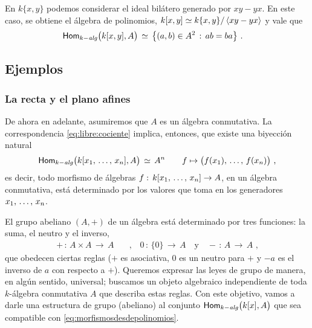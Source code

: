 \begin{ejemploLibre}\label{ejemplo:libre:cociente}
	En $k\{x,y\}$ podemos considerar el ideal bil\'{a}tero generado por
	$xy-yx$. En este caso, se obtiene el \'{a}lgebra de polinomios,
	$k[x,y]\simeq k\{x,y\}/\left\langle{xy-yx}\right\rangle_{}$ y vale que
	\begin{align*}
		\mathsf{Hom}_{k-\mathit{alg}}\big(k[x,y],A\big) & \,\simeq\,
			\big\{(a,b)\in A^2\,:\,ab=ba\big\}
		\text{ .}
	\end{align*}
\end{ejemploLibre}

\subsection{Ejemplos}\label{subsec:kalgebras:ejemplos}

\subsubsection{La recta y el plano afines}

De ahora en adelante, asumiremos que $A$ es un \'{a}lgebra conmutativa. La
correspondencia \eqref{eq:libre:cociente} implica, entonces, que existe una
biyecci\'{o}n natural
\begin{equation}
	\label{eq:morfismosdesdepolinomios}
	\Homalg\big(k[\lista{x}{n}],A\big) \,\simeq\, A^n
		\qquad f\mapsto\big(f(x_1),\,\dots,\,f(x_n)\big)
	\text{ ,}
\end{equation}
%
es decir, todo morfismo de \'{a}lgebras $f:\,k[\lista{x}{n}]\rightarrow A$, en
un \'{a}lgebra conmutativa, est\'{a} determinado por los valores que toma en
los generadores $\lista{x}{n}$.

El grupo abeliano $(A,+)$ de un \'{a}lgebra est\'{a} determinado por tres
funciones: la suma, el neutro y el inverso,
\begin{align*}
	+\,:\,A\times A\,\rightarrow\,A & \quad\text{,}\quad
		0\,:\,\{0\}\,\rightarrow\,A \quad\text{y}\quad
		-\,:\,A\,\rightarrow\,A
	\text{ ,}
\end{align*}
%
que obedecen ciertas reglas ($+$ es asociativa, $0$ es un neutro para $+$ y
$-a$ es el inverso de $a$ con respecto a $+$). Queremos expresar las leyes de
grupo de manera, en alg\'{u}n sentido, universal; buscamos un objeto algebraico
independiente de toda $k$-\'{a}lgebra conmutativa $A$ que describa estas
reglas. Con este objetivo, vamos a darle una estructura de grupo (abeliano) al
conjunto $\mathsf{Hom}_{k-\mathit{alg}}\big(k[x],A\big)$ que sea compatible con
\eqref{eq:morfismosdesdepolinomios}.

